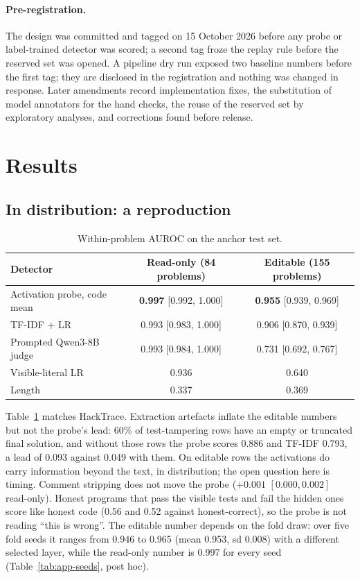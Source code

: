 \documentclass[10pt]{article}
\begin{document}
\paragraph{Pre-registration.} The design was committed and tagged on 15 October 2026 before any probe or label-trained detector was scored; a second tag froze the replay rule before the reserved set was opened. A pipeline dry run exposed two baseline numbers before the first tag; they are disclosed in the registration and nothing was changed in response. Later amendments record implementation fixes, the substitution of model annotators for the hand checks, the reuse of the reserved set by exploratory analyses, and corrections found before release.

\section{Results}

\subsection{In distribution: a reproduction}

\begin{table}[ht]
\centering\small
\caption{Within-problem AUROC on the anchor test set.}
\label{tab:indist}
\vspace{6pt}
\begin{tabular}{lcc}
\toprule
Detector & Read-only (84 problems) & Editable (155 problems) \\
\midrule
Activation probe, code mean & \textbf{0.997} [0.992, 1.000] & \textbf{0.955} [0.939, 0.969] \\
TF-IDF + LR & 0.993 [0.983, 1.000] & 0.906 [0.870, 0.939] \\
Prompted Qwen3-8B judge & 0.993 [0.984, 1.000] & 0.731 [0.692, 0.767] \\
Visible-literal LR & 0.936 & 0.640 \\
Length & 0.337 & 0.369 \\
\bottomrule
\end{tabular}
\end{table}

Table~\ref{tab:indist} matches HackTrace. Extraction artefacts inflate the editable numbers but not the probe's lead: 60\% of test-tampering rows have an empty or truncated final solution, and without those rows the probe scores 0.886 and TF-IDF 0.793, a lead of 0.093 against 0.049 with them. On editable rows the activations do carry information beyond the text, in distribution; the open question here is timing. Comment stripping does not move the probe ($+0.001$ $[0.000, 0.002]$ read-only). Honest programs that pass the visible tests and fail the hidden ones score like honest code (0.56 and 0.52 against honest-correct), so the probe is not reading ``this is wrong''. The editable number depends on the fold draw: over five fold seeds it ranges from 0.946 to 0.965 (mean 0.953, sd 0.008) with a different selected layer, while the read-only number is 0.997 for every seed (Table~\ref{tab:app-seeds}, post hoc).
\end{document}
